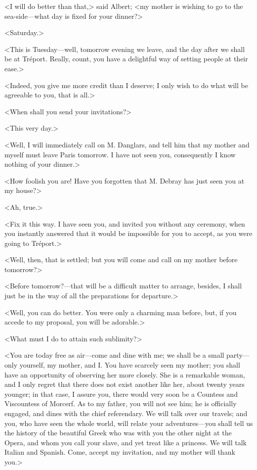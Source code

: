  <I will do better than that,> said Albert; <my mother is wishing to go to the sea-side—what day is fixed for your dinner?> 

 <Saturday.> 

 <This is Tuesday—well, tomorrow evening we leave, and the day after we shall be at Tréport. Really, count, you have a delightful way of setting people at their ease.> 

 <Indeed, you give me more credit than I deserve; I only wish to do what will be agreeable to you, that is all.> 

 <When shall you send your invitations?> 

 <This very day.> 

 <Well, I will immediately call on M. Danglars, and tell him that my mother and myself must leave Paris tomorrow. I have not seen you, consequently I know nothing of your dinner.> 

 <How foolish you are! Have you forgotten that M. Debray has just seen you at my house?> 

 <Ah, true.> 

 <Fix it this way. I have seen you, and invited you without any ceremony, when you instantly answered that it would be impossible for you to accept, as you were going to Tréport.> 

 <Well, then, that is settled; but you will come and call on my mother before tomorrow?> 

 <Before tomorrow?—that will be a difficult matter to arrange, besides, I shall just be in the way of all the preparations for departure.> 

 <Well, you can do better. You were only a charming man before, but, if you accede to my proposal, you will be adorable.> 

 <What must I do to attain such sublimity?> 

 <You are today free as air—come and dine with me; we shall be a small party—only yourself, my mother, and I. You have scarcely seen my mother; you shall have an opportunity of observing her more closely. She is a remarkable woman, and I only regret that there does not exist another like her, about twenty years younger; in that case, I assure you, there would very soon be a Countess and Viscountess of Morcerf. As to my father, you will not see him; he is officially engaged, and dines with the chief referendary. We will talk over our travels; and you, who have seen the whole world, will relate your adventures—you shall tell us the history of the beautiful Greek who was with you the other night at the Opera, and whom you call your slave, and yet treat like a princess. We will talk Italian and Spanish. Come, accept my invitation, and my mother will thank you.> 

